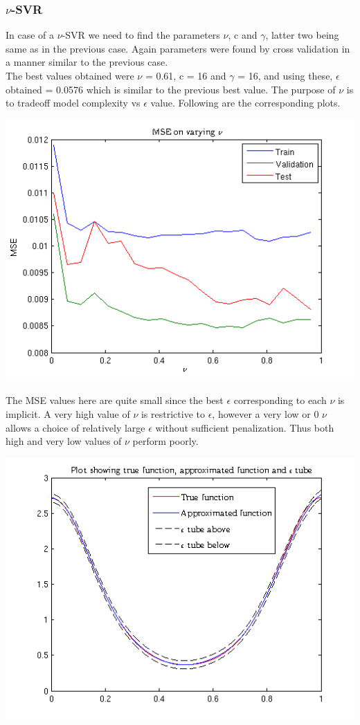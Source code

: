 \documentclass{article}
\begin{document}
\subsubsection{$\nu$-SVR}
In case of a $\nu$-SVR we need to find the parameters $\nu$, c and $\gamma$, latter two being same as in the previous case. Again parameters were found by cross validation in a manner similar to the previous case. \\[5pt]
The best values obtained were $\nu$ = 0.61, c = 16 and $\gamma$ = 16, and using these, $\epsilon$ obtained = 0.0576 which is similar to the previous best value. The purpose of $\nu$ is to tradeoff model complexity vs $\epsilon$ value. Following are the corresponding plots.
\begin{center}
\includegraphics[scale=1]{Regression/nu/mse}
\end{center}
The MSE values here are quite small since the best $\epsilon$ corresponding to each $\nu$ is implicit. A very high value of $\nu$ is restrictive to $\epsilon$, however a very low or 0 $\nu$ allows a choice of relatively large $\epsilon$ without sufficient penalization. Thus both high and very low values of $\nu$ perform poorly.
\begin{center}
\includegraphics[scale=1]{Regression/nu/Plot_1}
\end{center}
\end{document}
